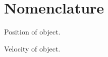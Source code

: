 
\chapter*{Nomenclature}

\begin{description}[leftmargin=!,labelwidth=1in]
\item[\textbf{x}] Position of object.
\item[\textbf{v}] Velocity of object.
\end{description}
